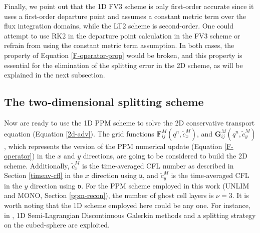 \documentclass[preprint,12pt]{elsarticle}
\begin{document}
\begin{linenumbers}
Finally, we point out that the 1D FV3 scheme is only first-order accurate since it uses a first-order departure point and assumes a constant metric term over the flux integration domains, while the LT2 scheme is second-order.
One could attempt to use RK2 in the departure point calculation in the FV3 scheme or refrain from using the constant metric term assumption. 
In both cases, the property of Equation \eqref{F-operator-prop} would be broken, and this property is essential for the elimination of the splitting error in the 2D scheme, as will be explained in the next subsection.

\subsection{The two-dimensional splitting scheme}
Now are ready to use the 1D PPM scheme to solve the 2D conservative transport equation (Equation \eqref{2d-adv}).
The grid functions
$\mathbf{F}_{ij}^M({{q}^n,\tilde{c}^{M}_x})$, and
$\mathbf{G}_{ij}^M({{q}^n,\tilde{c}^{M}_y})$,
which represents the version of the PPM numerical update (Equation \eqref{F-operator}) in the $x$ and $y$ directions, are going to be considered to build the 2D scheme.
Additionally, $\tilde{c}^{M}_x$ is the time-averaged CFL number as described in Section \ref{timeav-cfl} in the $x$ direction using $\mathfrak{u}$, and $\tilde{c}^{M}_y$ is the time-averaged CFL in the $y$ direction using $\mathfrak{v}$.
For the PPM scheme employed in this work (UNLIM and MONO, Section \ref{ppm-recon}), the number of ghost cell layers is $\nu=3$. 
It is worth noting that the 1D scheme employed here could be any one. 
For instance, in \cite{guo:2014}, 1D Semi-Lagrangian Discontinuous Galerkin methods and a splitting strategy on the cubed-sphere are exploited.


\end{linenumbers}
\end{document}
